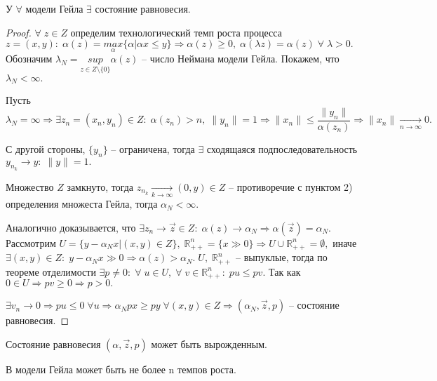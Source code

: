\begin{theorem}
	У $\forall$ модели Гейла $\exists$ состояние равновесия.
\end{theorem}

\begin{proof}
	$\forall \; z \in Z$ определим технологический темп роста процесса $z = (x, y): \; \alpha(z) = \underset{\alpha}{max}\{\alpha | \alpha x \leq y \} \Rightarrow \alpha(z) \geq 0, \; \alpha(\lambda z) = \alpha(z) \; \forall \; \lambda > 0.$ Обозначим $\lambda_N = \underset{z \in Z \setminus \{ 0\} }{sup} \alpha(z)$ -- число Неймана модели Гейла. Покажем, что $\lambda_N < \infty.$

	Пусть $\lambda_N = \infty \Rightarrow \exists z_n = (x_n, y_n) \in Z: \; \alpha(z_n) > n, \; \| y_n\| = 1 \Rightarrow \| x_n\| \leq \dfrac{\| y_n\|}{\alpha(z_n)} \Rightarrow \| x_n \| \underset{n \to \infty}{\to} 0.$

	С другой стороны, $\{ y_n\}$ -- ограничена, тогда $\exists$ сходящаяся подпоследовательность $y_{n_k} \to y: \; \| y\| = 1.$

	Множество $Z$ замкнуто, тогда $z_{n_k} \underset{k \to \infty}{\to} (0,y) \in Z$ -- противоречие с пунктом 2) определения множеста Гейла, тогда $\alpha_N < \infty.$

	Аналогично доказывается, что $\exists z_n \to \vec{z}\in Z: \; \alpha(z) \to \alpha_N \Rightarrow \alpha(\vec{z}) = \alpha_N.$ Рассмотрим $U = \{ y - \alpha_N x | (x,y) \in Z\}, \; \mathbb{R}^n_{++} = \{ x \gg 0\} \Rightarrow U \cup \mathbb{R}^n_{++} = \emptyset,$ иначе $\exists (x,y)\in Z: \; y - \alpha_N x \gg 0 \Rightarrow \alpha(z) > \alpha_N. \; U, \; \mathbb{R}^n_{++}$ -- выпуклые, тогда по теореме отделимости $\exists p \neq 0: \; \forall \; u \in U, \; \forall \; v \in \mathbb{R}^n_{++}: \; pu \leq pv.$ Так как $0 \in U \Rightarrow pv \geq 0 \Rightarrow p > 0.$

	$\exists v_n \to 0 \Rightarrow pu \leq 0 \; \forall u \Rightarrow \alpha_N px \geq py \; \forall (x, y) \in Z \Rightarrow (\alpha_N, \vec{z}, p) $ -- состояние равновесия.
\end{proof} 

\begin{remark}
	Состояние равновесия $(\alpha, \vec{z}, p)$ может быть вырожденным.
\end{remark}

\begin{clair}
	В модели Гейла может быть не более n темпов роста.
\end{clair}
	
